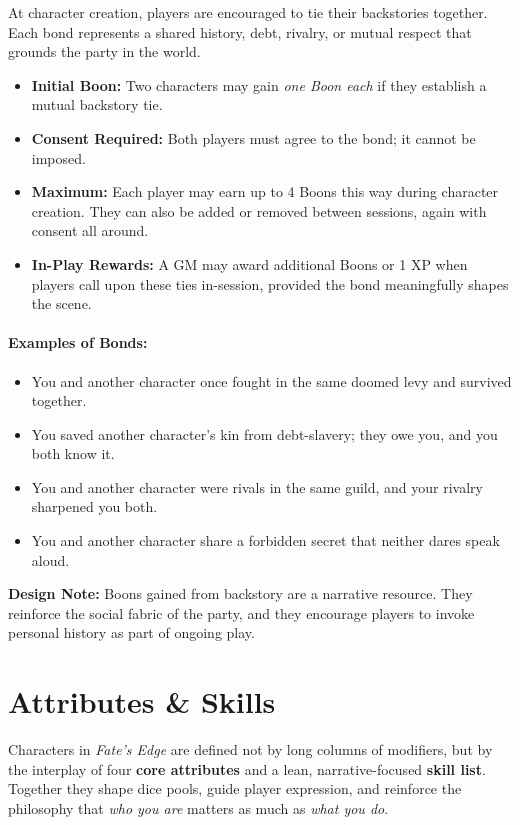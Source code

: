 \documentclass[12pt]{article}
\begin{document}
At character creation, players are encouraged to tie their backstories together.  
Each bond represents a shared history, debt, rivalry, or mutual respect that grounds the party in the world.  

\begin{itemize}
  \item \textbf{Initial Boon:} Two characters may gain \emph{one Boon each} if they establish a mutual backstory tie.  
  \item \textbf{Consent Required:} Both players must agree to the bond; it cannot be imposed.  
  \item \textbf{Maximum:} Each player may earn up to 4 Boons this way during character creation. They can also be added or removed between sessions, again with consent all around. 
  \item \textbf{In-Play Rewards:} A GM may award additional Boons or 1 XP when players call upon these ties in-session, provided the bond meaningfully shapes the scene.  
\end{itemize}

\paragraph{Examples of Bonds:}
\begin{itemize}
  \item You and another character once fought in the same doomed levy and survived together.  
  \item You saved another character’s kin from debt-slavery; they owe you, and you both know it.  
  \item You and another character were rivals in the same guild, and your rivalry sharpened you both.  
  \item You and another character share a forbidden secret that neither dares speak aloud.  
\end{itemize}

\noindent
\textbf{Design Note:} Boons gained from backstory are a narrative resource.  
They reinforce the social fabric of the party, and they encourage players to invoke personal history as part of ongoing play.

\section{Attributes \& Skills}

Characters in \textit{Fate’s Edge} are defined not by long columns of modifiers, but by the interplay of four \textbf{core attributes} and a lean, narrative-focused \textbf{skill list}. Together they shape dice pools, guide player expression, and reinforce the philosophy that \emph{who you are} matters as much as \emph{what you do}.
\end{document}
